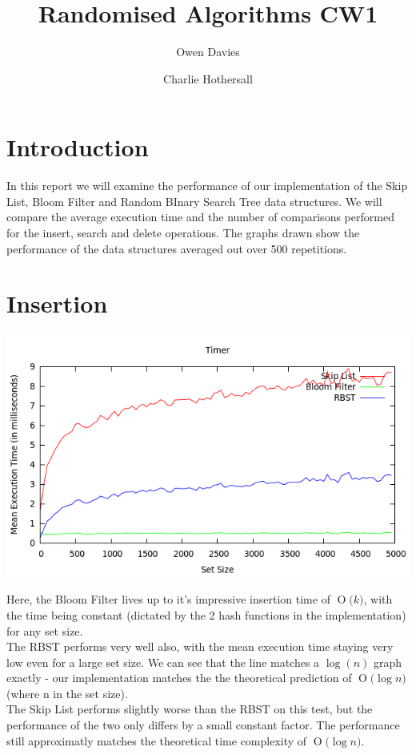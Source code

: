 \documentclass[11pt, notitlepage]{report}
\title{Randomised Algorithms CW1}
\date{}
\author{Owen Davies \and Charlie Hothersall}
\newcommand{\BigO}[1]{\ensuremath{\operatorname{O}\bigl(#1\bigr)}}
\begin{document}
\maketitle

\section*{Introduction}

In this report we will examine the performance of our implementation of the Skip List, Bloom Filter and Random BInary Search Tree data structures. We will compare the average execution time and the number of comparisons performed for the insert, search and delete operations. The graphs drawn show the performance of the data structures averaged out over 500 repetitions.

\section*{Insertion}

\includegraphics[width=\textwidth]{img/Timer-Add}

Here, the Bloom Filter lives up to it's impressive insertion time of \BigO{k}, with the time being constant (dictated by the 2 hash functions in the implementation) for any set size.\\

The RBST performs very well also, with the mean execution time staying very low even for a large set size. We can see that the line matches a $\log(n)$ graph exactly - our implementation matches the the theoretical prediction of \BigO{\log n} (where n in the set size).\\

The Skip List performs slightly worse than the RBST on this test, but the performance of the two only differs by a small constant factor. The performance still approximatly matches the theoretical time complexity of \BigO{\log n}.
\end{document}
